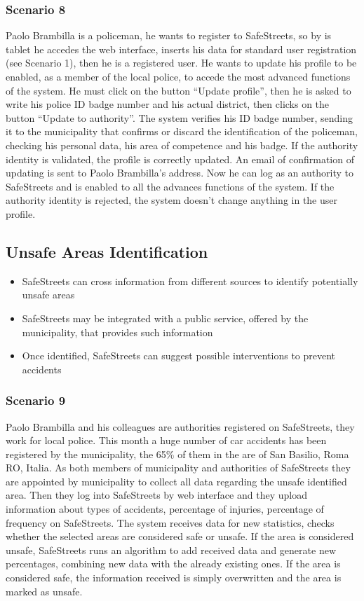 \subsubsection{Scenario 8}
Paolo Brambilla is a policeman, he wants to register to SafeStreets, so by is tablet he accedes the web interface, inserts his data for standard user registration (see Scenario 1), then he is a registered user. He wants to update his profile to be enabled, as a member of the local police, to accede the most advanced functions of the system. He must click on the button “Update profile”, then he is asked to write his police ID badge number and his actual district, then clicks on the button “Update to authority”. The system verifies his ID badge number, sending it to the municipality that confirms or discard the identification of the policeman, checking his personal data, his area of competence and his badge. If the authority identity is validated, the profile is correctly updated. An email of confirmation of updating is sent to Paolo Brambilla’s address. Now he can log as an authority to SafeStreets and is enabled to all the advances functions of the system. If the authority identity is rejected, the system doesn’t change anything in the user profile.

\subsection{Unsafe Areas Identification}
\begin{itemize}
  \item SafeStreets can cross information from different sources to identify potentially unsafe areas
  \item SafeStreets may be integrated with a public service, offered by the municipality, that provides such information
  \item Once identified, SafeStreets can suggest possible interventions to prevent accidents
\end{itemize}
\subsubsection{Scenario 9}
Paolo Brambilla and his colleagues are authorities registered on SafeStreets, they work for local police. This month a huge number of car accidents has been registered by the municipality, the 65\% of them in the are of San Basilio, Roma RO, Italia. As both members of municipality and authorities of SafeStreets they are appointed by municipality to collect all data regarding the unsafe identified area. Then they log into SafeStreets by web interface and they upload information about types of accidents, percentage of injuries, percentage of frequency on SafeStreets. The system receives data for new statistics, checks whether the selected areas are considered safe or unsafe. If the area is considered unsafe, SafeStreets runs an algorithm to add received data and generate new percentages, combining new data with the already existing ones. If the area is considered safe, the information received is simply overwritten and the area is marked as unsafe.

